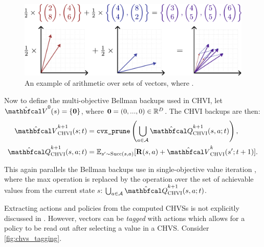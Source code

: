         \begin{figure}
            \centering\includegraphics[width=1.0\textwidth]{figures/ch2/ch_arithmetic.pdf} 
            \caption[An example of arithmetic over sets of vectors.]{An example of arithmetic over sets of vectors, where .}
            \label{fig:vectorset_arithmetic}
        \end{figure}

        Now to define the multi-objective Bellman backups used in CHVI, let $\hat{\bfcl{V}}^0(s) = \{ \bff{0} \}$, where $\mathbf{0}=(0,...,0)\in\mathbb{R}^D$. The CHVI backups are then:
        \begin{align}
            \Vchvi^{k+1}(s;t) &= \cprune \left( \bigcup_{a\in\cl{A}} \Qchvi^{k+1}(s,a;t) \right), \\
            \Qchvi^{k+1}(s,a;t) &= \bb{E}_{s'\sim \suc{s}{a}} [\bff{R}(s,a) + \Vchvi^k(s';t+1)].
        \end{align}
        
        This again parallels the Bellman backups use in single-objective value iteration , where the max operation is replaced by the \cprune\ewe operation over the set of achievable values from the current state $s$: $\bigcup_{a\in\cl{A}} \Qchvi^{k+1}(s,a;t)$.

        Extracting actions and policies from the computed CHVSs is not explicitly discussed in \cite{chvi}. However, vectors can be \textit{tagged} with actions which allows for a policy to be read out after selecting a value in a CHVS. Consider  \ref{fig:chvs_tagging}.
        
